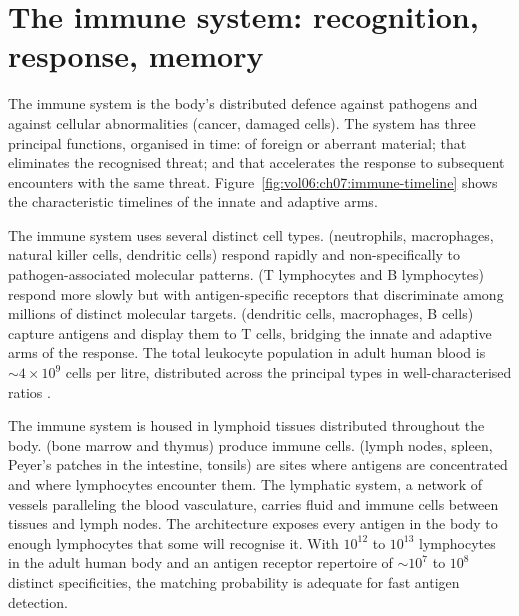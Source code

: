 \section{The immune system: recognition, response, memory}

The immune system is the body's distributed defence against
pathogens and against cellular abnormalities (cancer, damaged cells).
The system has three principal functions, organised in time:
 of foreign or aberrant material;
 that eliminates the recognised threat; and
 that accelerates the response to subsequent
encounters with the same threat. Figure~\ref{fig:vol06:ch07:immune-timeline}
shows the characteristic timelines of the innate and adaptive arms.



 The immune system uses several distinct
cell types.  (neutrophils, macrophages,
natural killer cells, dendritic cells) respond rapidly and
non-specifically to pathogen-associated molecular patterns.
 (T lymphocytes and B lymphocytes)
respond more slowly but with antigen-specific receptors that
discriminate among millions of distinct molecular targets.
 (dendritic cells, macrophages,
B cells) capture antigens and display them to T cells, bridging the
innate and adaptive arms of the response. The total leukocyte
population in adult human blood is $\sim 4 \times 10^9$ cells per
litre, distributed across the principal types in well-characterised
ratios \cite[ch.~1]{text:v6c07-janeway-immunobiology-2017}.

 The immune system is housed in lymphoid
tissues distributed throughout the body.  (bone marrow and thymus) produce immune cells.
 (lymph nodes, spleen, Peyer's
patches in the intestine, tonsils) are sites where antigens are
concentrated and where lymphocytes encounter them. The lymphatic
system, a network of vessels paralleling the blood vasculature,
carries fluid and immune cells between tissues and lymph nodes. The
architecture exposes every antigen in the body to enough lymphocytes
that some will recognise it. With $10^{12}$ to $10^{13}$ lymphocytes
in the adult human body and an antigen receptor repertoire of
$\sim 10^7$ to $10^8$ distinct specificities, the matching
probability is adequate for fast antigen detection.

